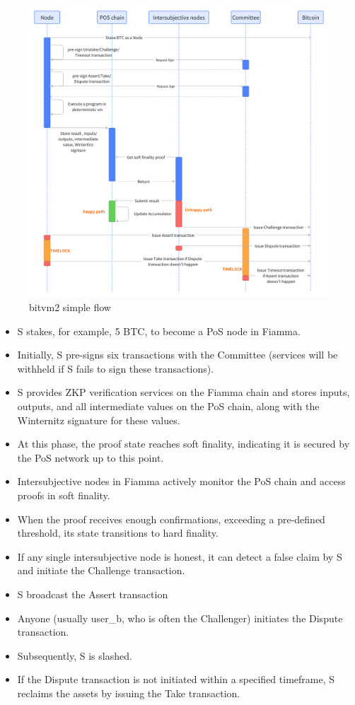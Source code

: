 \begin{figure}[ht] 
    \centering  
    \includegraphics[width=0.85\columnwidth]{images/bitvm2 simple flow.png} 
    \caption{bitvm2 simple flow}
    \label{fig:bitvm2 simple flow}
\end{figure}

\begin{itemize}
    \item S stakes, for example, 5 BTC, to become a PoS node in Fiamma.
    \item Initially, S pre-signs six transactions with the Committee (services will be withheld if S fails to sign these transactions).
    \item S provides ZKP verification services on the Fiamma chain and stores inputs, outputs, and all intermediate values on the PoS chain, along with the Winternitz signature for these values.
    \item At this phase, the proof state reaches soft finality, indicating it is secured by the PoS network up to this point.
    \item Intersubjective nodes in Fiamma actively monitor the PoS chain and access proofs in soft finality.
    \item When the proof receives enough confirmations, exceeding a pre-defined threshold, its state transitions to hard finality.
    \item If any single intersubjective node is honest, it can detect a false claim by S and initiate the Challenge transaction.
    \item S broadcast the Assert transaction
    \item Anyone (usually user_b, who is often the Challenger) initiates the Dispute transaction.
    \item Subsequently, S is slashed.
    \item If the Dispute transaction is not initiated within a specified timeframe, S reclaims the assets by issuing the Take transaction.
\end{itemize}

